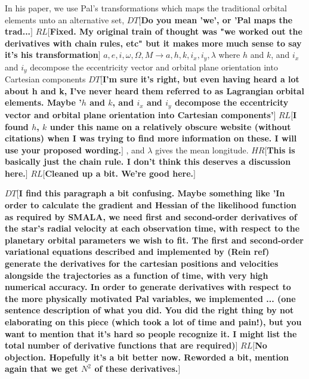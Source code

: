 \documentclass{aa}
\def\memohr#1{\color{blue}$HR[${\bf #1}$]$ \color{black}}
\def\memodt#1{\color{green}$DT[${\bf #1}$]$ \color{black}}
\def\memorl#1{\color{gray}$RL[${\bf #1}$]$ \color{black}}
\begin{document}
In his paper, we use Pal's transformations which maps the traditional orbital elements unto an alternative set, \memodt{Do you mean 'we', or 'Pal maps the trad...}\memorl{Fixed. My original train of thought was "we worked out the derivatives with chain rules, etc" but it makes more much sense to say it's his transformation} $a, e, i, \omega, \Omega, M \to a, h, k, i_x, i_y, \lambda$ where $h$ and $k$, and $i_x$ and $i_y$ decompose the eccentricity vector and orbital plane orientation into Cartesian components \memodt{I'm sure it's right, but even having heard a lot about h and k, I've never heard them referred to as Lagrangian orbital elements. Maybe '$h$ and $k$, and $i_x$ and $i_y$ decompose the eccentricity vector and orbital plane orientation into Cartesian components'}\memorl{I found $h$, $k$ under this name on a relatively obscure website (without citations) when I was trying to find more information on these. I will use your proposed wording.}, and $\lambda$ gives the mean longitude. 
\memohr{This is basically just the chain rule. I don't think this deserves a discussion here.}
\memorl{Cleaned up a bit. We're good here.}


\memodt{I find this paragraph a bit confusing. Maybe something like 'In order to calculate the gradient and Hessian of the likelihood function as required by SMALA, we need first and second-order derivatives of the star's radial velocity at each observation time, with respect to the planetary orbital parameters we wish to fit.  The first and second-order variational equations described and implemented by (Rein ref) generate the derivatives for the cartesian positions and velocities alongside the trajectories as a function of time, with very high numerical accuracy. In order to generate derivatives with respect to the more physically motivated Pal variables, we implemented ... (one sentence description of what you did. You did the right thing by not elaborating on this piece (which took a lot of time and pain!), but you want to mention that it's hard so people recognize it. I might list the total number of derivative functions that are required)}
\memorl{No objection. Hopefully it's a bit better now. Reworded a bit, mention again that we get $N^2$ of these derivatives.}
\end{document}
